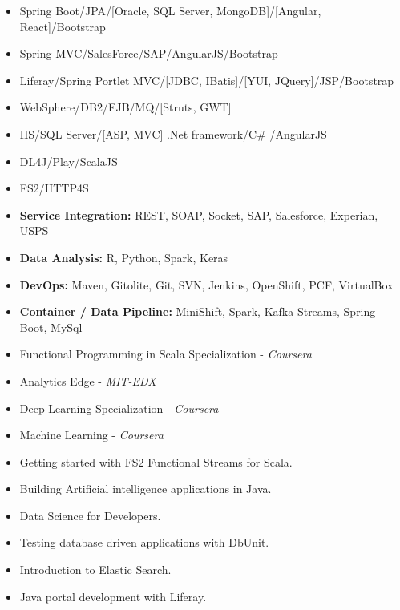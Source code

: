\documentclass[10pt,a4paper,ragged2e]{altacv}
\begin{document}




\clearpage

\begin{itemize}
\item Spring Boot/JPA/[Oracle, SQL Server, MongoDB]/[Angular, React]/Bootstrap
\item Spring MVC/SalesForce/SAP/AngularJS/Bootstrap
\item Liferay/Spring Portlet MVC/[JDBC, IBatis]/[YUI, JQuery]/JSP/Bootstrap
\item WebSphere/DB2/EJB/MQ/[Struts, GWT]
\item IIS/SQL Server/[ASP, MVC] .Net framework/C\# /AngularJS
\item DL4J/Play/ScalaJS
\item FS2/HTTP4S
\item \textbf{Service Integration:} REST, SOAP, Socket, SAP, Salesforce, Experian, USPS
\item \textbf{Data Analysis:} R, Python, Spark, Keras
\item \textbf{DevOps:} Maven, Gitolite, Git, SVN, Jenkins, OpenShift, PCF, VirtualBox 
\item \textbf{Container / Data Pipeline:} MiniShift, Spark, Kafka Streams, Spring Boot, MySql 

\end{itemize}

\begin{itemize}
\item Functional Programming in Scala Specialization - \textit{Coursera}
\item Analytics Edge - \textit{MIT-EDX}
\item Deep Learning Specialization - \textit{Coursera}
\item Machine Learning - \textit{Coursera}
\end{itemize}

\begin{itemize}
\item Getting started with FS2 Functional Streams for Scala.
\item Building Artificial intelligence applications in Java.
\item Data Science for Developers.
\item Testing database driven applications with DbUnit.
\item Introduction to Elastic Search.
\item Java portal development with Liferay.

\end{itemize}
\end{document}
